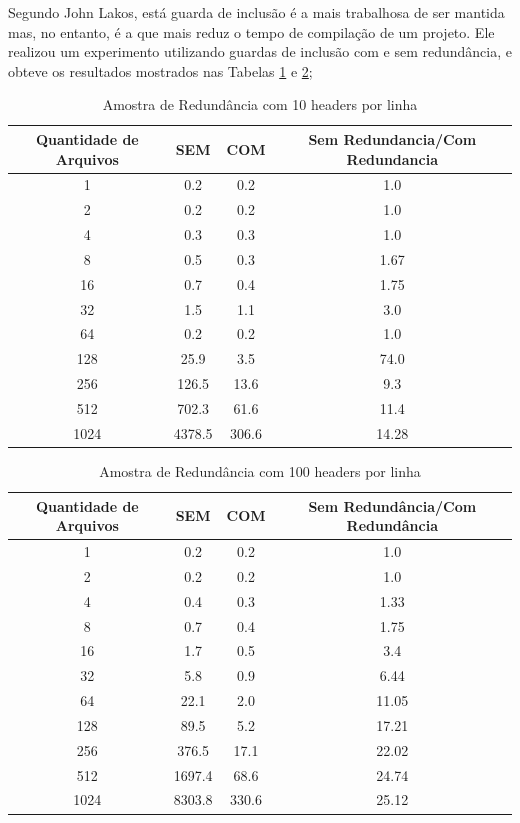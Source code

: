 \begin{enumerate}
Segundo John Lakos, está guarda de inclusão é a mais trabalhosa de ser mantida
 mas, no entanto, é a que mais reduz o tempo de compilação de um projeto. Ele
 realizou um experimento utilizando guardas de inclusão com e sem redundância,
 e obteve os resultados mostrados nas Tabelas \ref{tab:tabela_01} e 
\ref{tab:tabela_02};

\begin{table}
    \centering
    \begin{tabular}{ c | c | c | c }
    \hline
    Quantidade de Arquivos & SEM & COM & Sem Redundancia/Com Redundancia\\
    \hline
    1 & 0.2 & 0.2 & 1.0\\
    \hline
    2 & 0.2 & 0.2 & 1.0\\
    \hline
    4 & 0.3 & 0.3 & 1.0\\
    \hline
    8 & 0.5 & 0.3 & 1.67\\
    \hline
    16 & 0.7 & 0.4 & 1.75\\
    \hline
    32 & 1.5 & 1.1 & 3.0\\
    \hline
    64 & 0.2 & 0.2 & 1.0\\
    \hline
    128 & 25.9 & 3.5 & 74.0\\
    \hline
    256 & 126.5 & 13.6 & 9.3\\
    \hline
    512 & 702.3 & 61.6 & 11.4\\
    \hline
    1024 & 4378.5 & 306.6 & 14.28\\
    \hline
    \end{tabular}
    \caption {Amostra de Redundância com 10 headers por linha}
    \label{tab:tabela_01}
\end{table}

\begin{table}[h]
    \centering
    \begin{tabular}{ |c | c | c | c |}
    \hline
    Quantidade de Arquivos & SEM & COM & Sem Redundância/Com Redundância\\
    \hline
    1 & 0.2 & 0.2 & 1.0\\
    \hline
    2 & 0.2 & 0.2 & 1.0\\
    \hline
    4 & 0.4 & 0.3 & 1.33\\
    \hline
    8 & 0.7 & 0.4 & 1.75\\
    \hline
    16 & 1.7 & 0.5 & 3.4\\
    \hline
    32 & 5.8 & 0.9 & 6.44\\
    \hline
    64 & 22.1 & 2.0 & 11.05\\
    \hline
    128 & 89.5 & 5.2 & 17.21\\
    \hline
    256 & 376.5 & 17.1 & 22.02\\
    \hline
    512 & 1697.4 & 68.6 & 24.74\\
    \hline
    1024 & 8303.8 & 330.6 & 25.12\\
    \hline
    \end{tabular}
    \caption {Amostra de Redundância com 100 headers por linha }
    \label{tab:tabela_02}
\end{table}


\end{enumerate}
